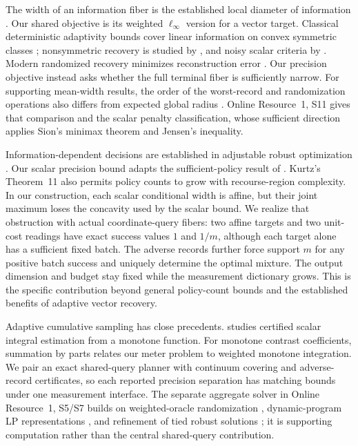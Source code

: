 \documentclass[12pt]{article}
\begin{document}
The width of an information fiber is the established local diameter of
information \citep[Section~4.1]{novak2008}. Our shared objective is its
weighted $\ell_\infty$ version for a vector target. Classical deterministic
adaptivity bounds cover linear information on convex symmetric classes
\citep[Theorems~4.4--4.5]{novak2008}; nonsymmetric recovery is studied by
\citet{novak1995}, and noisy scalar criteria by
\citet[Theorems~2--3 and~5]{osipenko}. Modern randomized recovery minimizes
reconstruction error \citep[Section~2 and Proposition~4.1]{krieg2025}
\citep[Section~9.1, Eq.~(9.15), author manuscript v2]{krieg2026}.
Our precision objective instead asks whether the full terminal fiber is
sufficiently narrow. For supporting mean-width results, the order of the
worst-record and randomization operations also differs from expected global
radius \citep[Eq.~(2.4), Remark~6.1, author manuscript v2]{krieg2026}.
Online Resource~1, S11 gives that comparison and the scalar penalty
classification, whose sufficient direction applies Sion's minimax theorem
\citep[Theorem~3.4]{sion1958} and Jensen's inequality.

Information-dependent decisions are established in adjustable robust
optimization \citep{wei2024,ddid}. Our scalar precision bound adapts the
sufficient-policy result of \citet[Theorem~2 and Example~5]{kurtz2026}.
Kurtz's Theorem~11 also permits policy counts to grow with recourse-region
complexity. In our construction, each scalar conditional width is affine,
but their joint maximum loses the concavity used by the scalar bound.
We realize that obstruction with actual coordinate-query fibers: two
affine targets and two unit-cost readings have exact success values $1$
and $1/m$, although each target alone has a sufficient fixed batch.
The adverse records further force support $m$ for any positive batch
success and uniquely determine the optimal mixture. The output dimension
and budget stay fixed while the measurement dictionary grows. This is the
specific contribution beyond general policy-count bounds and the established
benefits of adaptive vector recovery.

Adaptive cumulative sampling has close precedents.
\citet[Section~4.1.1, Corollary~1 and Theorem~3]{gaillard2023} studies
certified scalar integral estimation from a monotone function. For monotone
contrast coefficients, summation by parts relates our meter problem to
weighted monotone integration. We pair an exact shared-query planner with
continuum covering and adverse-record certificates, so each reported
precision separation has matching bounds under one measurement interface.
The separate aggregate solver in Online Resource~1, S5/S7 builds on
weighted-oracle randomization \citep{kawase2024}, dynamic-program LP
representations \citep{martin1990}, and refinement of tied robust solutions
\citep{iancu2014}; it is supporting computation rather than the central
shared-query contribution.
\end{document}
